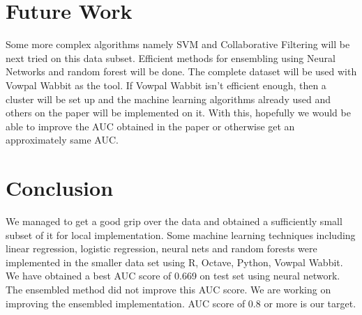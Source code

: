 \documentclass[10pt]{article}
\begin{document}
\section{Future Work}
Some more complex algorithms namely SVM and Collaborative Filtering will be next tried on this data subset. Efficient methods for ensembling using Neural Networks and random forest will be done. The complete dataset will be used with Vowpal Wabbit as the tool. If Vowpal Wabbit isn't efficient enough, then a cluster will be set up and the machine learning algorithms already used and others on the paper will be implemented on it. With this, hopefully we would be able to improve the AUC obtained in the paper or otherwise get an approximately same AUC.

\section{Conclusion}
We managed to get a good grip over the data and obtained a sufficiently small subset of it for local implementation. Some machine learning techniques including linear regression, logistic regression, neural nets and random forests were implemented in the smaller data set using R, Octave, Python, Vowpal Wabbit. We have obtained a best AUC score of 0.669 on test set using neural network. The ensembled method did not improve this AUC score. We are working on improving the ensembled implementation. AUC score of 0.8 or more is our target.
\end{document}
